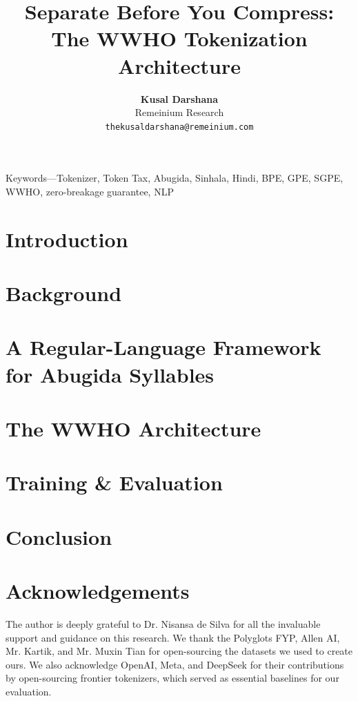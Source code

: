 \documentclass{article}
\title{Separate Before You Compress: The WWHO Tokenization Architecture}
\author{
  \textbf{Kusal Darshana} \\
  Remeinium Research \\
  \texttt{thekusaldarshana@remeinium.com}
}
\theoremstyle{definition}
\begin{document}
\maketitle

\begin{abstract}

\end{abstract}

Keywords---Tokenizer, Token Tax, Abugida, Sinhala, Hindi, BPE, GPE, SGPE, WWHO, zero-breakage guarantee, NLP

\section{Introduction}


\section{Background}


\section{A Regular-Language Framework for Abugida Syllables}


\section{The WWHO Architecture}


\section{Training \& Evaluation}


\section{Conclusion}


\section*{Acknowledgements}
The author is deeply grateful to Dr. Nisansa de Silva for all the invaluable support and guidance on this research. We thank the Polyglots FYP\cite{polyglots}, Allen AI\cite{allen2023madlad400}, Mr. Kartik\cite{hicm2024synthetic}, and Mr. Muxin Tian\cite{cc100sinhala} for open-sourcing the datasets we used to create ours\cite{wwho30m}.
We also acknowledge OpenAI\cite{tiktoken}, Meta\cite{llama4scout}, and DeepSeek\cite{deepseekv3} for their contributions by open-sourcing frontier tokenizers, which served as essential baselines for our evaluation.

 

\end{document}
